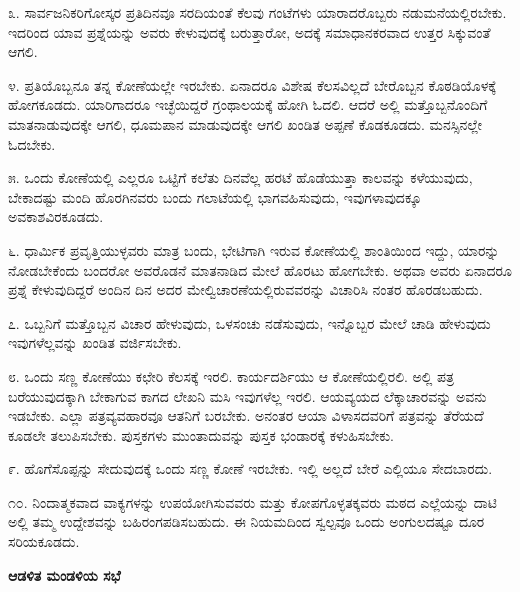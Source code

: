 ೩. ಸಾರ್ವಜನಿಕರಿಗೋಸ್ಕರ ಪ್ರತಿದಿನವೂ ಸರದಿಯಂತೆ ಕೆಲವು ಗಂಟೆಗಳು ಯಾರಾದರೊಬ್ಬರು ನಡುಮನೆಯಲ್ಲಿರಬೇಕು. ಇದರಿಂದ ಯಾವ ಪ್ರಶ್ನೆಯನ್ನು ಅವರು ಕೇಳುವುದಕ್ಕೆ ಬರುತ್ತಾರೋ, ಅದಕ್ಕೆ ಸಮಾಧಾನಕರವಾದ ಉತ್ತರ ಸಿಕ್ಕುವಂತೆ ಆಗಲಿ.

\vspace{0.1cm}

೪. ಪ್ರತಿಯೊಬ್ಬನೂ ತನ್ನ ಕೋಣೆಯಲ್ಲೇ ಇರಬೇಕು. ಏನಾದರೂ ವಿಶೇಷ ಕೆಲಸವಿಲ್ಲದೆ ಬೇರೊಬ್ಬನ ಕೊಠಡಿಯೊಳಕ್ಕೆ ಹೋಗಕೂಡದು. ಯಾರಿಗಾದರೂ ಇಚ್ಛೆಯಿದ್ದರೆ ಗ್ರಂಥಾಲಯಕ್ಕೆ ಹೋಗಿ ಓದಲಿ. ಆದರೆ ಅಲ್ಲಿ ಮತ್ತೊಬ್ಬನೊಂದಿಗೆ ಮಾತನಾಡುವುದಕ್ಕೇ ಆಗಲಿ, ಧೂಮಪಾನ ಮಾಡುವುದಕ್ಕೇ ಆಗಲಿ ಖಂಡಿತ ಅಪ್ಪಣೆ ಕೊಡಕೂಡದು. ಮನಸ್ಸಿನಲ್ಲೇ ಓದಬೇಕು.

\vspace{0.1cm}

೫. ಒಂದು ಕೋಣೆಯಲ್ಲಿ ಎಲ್ಲರೂ ಒಟ್ಟಿಗೆ ಕಲೆತು ದಿನವೆಲ್ಲ ಹರಟೆ ಹೊಡೆಯುತ್ತಾ ಕಾಲವನ್ನು ಕಳೆಯುವುದು, ಬೇಕಾದಷ್ಟು ಮಂದಿ ಹೊರಗಿನವರು ಬಂದು ಗಲಾಟೆಯಲ್ಲಿ ಭಾಗವಹಿಸುವುದು, ಇವುಗಳಾವುದಕ್ಕೂ ಅವಕಾಶವಿರಕೂಡದು.

\vspace{0.1cm}

೬. ಧಾರ್ಮಿಕ ಪ್ರವೃತ್ತಿಯುಳ್ಳವರು ಮಾತ್ರ ಬಂದು, ಭೇಟಿಗಾಗಿ ಇರುವ ಕೋಣೆಯಲ್ಲಿ ಶಾಂತಿಯಿಂದ ಇದ್ದು, ಯಾರನ್ನು ನೋಡಬೇಕೆಂದು ಬಂದರೋ ಅವರೊಡನೆ ಮಾತನಾಡಿದ ಮೇಲೆ ಹೊರಟು ಹೋಗಬೇಕು. ಅಥವಾ ಅವರು ಏನಾದರೂ ಪ್ರಶ್ನೆ ಕೇಳುವುದಿದ್ದರೆ ಅಂದಿನ ದಿನ ಅದರ ಮೇಲ್ವಿಚಾರಣೆಯಲ್ಲಿರುವವರನ್ನು ವಿಚಾರಿಸಿ ನಂತರ ಹೊರಡಬಹುದು.

\vspace{0.1cm}

೭. ಒಬ್ಬನಿಗೆ ಮತ್ತೊಬ್ಬನ ವಿಚಾರ ಹೇಳುವುದು, ಒಳಸಂಚು ನಡೆಸುವುದು, ಇನ್ನೊಬ್ಬರ ಮೇಲೆ ಚಾಡಿ ಹೇಳುವುದು ಇವುಗಳೆಲ್ಲವನ್ನು ಖಂಡಿತ ವರ್ಜಿಸಬೇಕು.

\vspace{0.1cm}

೮. ಒಂದು ಸಣ್ಣ ಕೋಣೆಯು ಕಛೇರಿ ಕೆಲಸಕ್ಕೆ ಇರಲಿ. ಕಾರ್ಯದರ್ಶಿಯು ಆ ಕೋಣೆಯಲ್ಲಿರಲಿ. ಅಲ್ಲಿ ಪತ್ರ ಬರೆಯುವುದಕ್ಕಾಗಿ ಬೇಕಾಗುವ ಕಾಗದ ಲೇಖನಿ ಮಸಿ ಇವುಗಳೆಲ್ಲ ಇರಲಿ. ಆಯವ್ಯಯದ ಲೆಕ್ಕಾಚಾರವನ್ನು ಅವನು ಇಡಬೇಕು. ಎಲ್ಲಾ ಪತ್ರವ್ಯವಹಾರವೂ ಆತನಿಗೆ ಬರಬೇಕು. ಅನಂತರ ಆಯಾ ವಿಳಾಸದವರಿಗೆ ಪತ್ರವನ್ನು ತೆರೆಯದೆ ಕೂಡಲೇ ತಲುಪಿಸಬೇಕು. ಪುಸ್ತಕಗಳು ಮುಂತಾದುವನ್ನು ಪುಸ್ತಕ ಭಂಡಾರಕ್ಕೆ ಕಳುಹಿಸಬೇಕು.

\eject

೯. ಹೊಗೆಸೊಪ್ಪನ್ನು ಸೇದುವುದಕ್ಕೆ ಒಂದು ಸಣ್ಣ ಕೋಣೆ ಇರಬೇಕು. ಇಲ್ಲಿ ಅಲ್ಲದೆ ಬೇರೆ ಎಲ್ಲಿಯೂ ಸೇದಬಾರದು.

\vspace{0.13cm}

೧೦. ನಿಂದಾತ್ಮಕವಾದ ವಾಕ್ಯಗಳನ್ನು ಉಪಯೋಗಿಸುವವರು ಮತ್ತು ಕೋಪಗೊಳ್ಳತಕ್ಕವರು ಮಠದ ಎಲ್ಲೆಯನ್ನು ದಾಟಿ ಅಲ್ಲಿ ತಮ್ಮ ಉದ್ದೇಶವನ್ನು ಬಹಿರಂಗಪಡಿಸಬಹುದು. ಈ ನಿಯಮದಿಂದ ಸ್ವಲ್ಪವೂ ಒಂದು ಅಂಗುಲದಷ್ಟೂ ದೂರ ಸರಿಯಕೂಡದು.
\vspace{0.2cm}

\begin{center}
\textbf{ಆಡಳಿತ ಮಂಡಳಿಯ ಸಭೆ}
\end{center}
\vspace{0.2cm}

